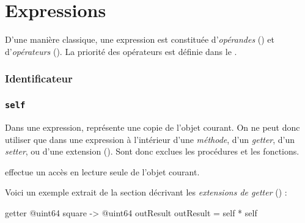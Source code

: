 
\chapter{Expressions}

D'une manière classique, une expression est constituée d'\emph{opérandes} () et d'\emph{opérateurs} (). La priorité des opérateurs est définie dans le .





\subsection{Identificateur}

\subsection{\texttt{self}}

Dans une expression,  représente une copie de l'objet courant. On ne peut donc utiliser  que dans une expression à l'intérieur d'une \emph{méthode}, d'un \emph{getter}, d'un \emph{setter}, ou d'une extension (). Sont donc exclues les procédures et les fonctions.

 effectue un accès en lecture seule de l'objet courant. 

Voici un exemple extrait de la section décrivant les \emph{extensions de getter} () :
\begin{galgascode}
getter @uint64 square -> @uint64 outResult {
  outResult = self * self
}
\end{galgascode}










